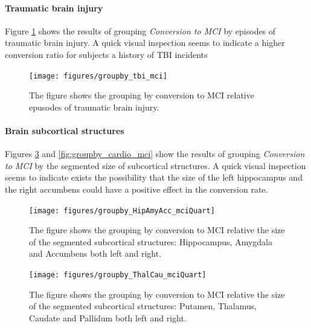 \documentclass[11pt]{article}
\theoremstyle{definition}
\theoremstyle{remark}
\begin{document}
\paragraph*{Traumatic brain injury}
Figure \ref{fig:groupby_tbi_mci} shows the results of grouping \emph{Conversion to MCI} by episodes of traumatic brain injury. A quick visual inspection seems to indicate a higher conversion ratio for subjects a history of TBI incidents

\begin{figure}[H]
        \centering
        \texttt{[image: figures/groupby\_tbi\_mci]}
        \caption{The figure shows the grouping by conversion to MCI relative epusodes of traumatic brain injury.}
        \label{fig:groupby_tbi_mci}
\end{figure}

\paragraph{Brain subcortical structures}

Figures \ref{fig:groupby_HipAmyAcc_mciQuart} and \ref{fig:groupby_cardio_mci} show the results of grouping \emph{Conversion to MCI} by the segmented size of subcortical structures. 
A quick visual inspection seems to indicate exists the possibility that the size of the left hippocampus and the right accumbens could have a positive effect in the conversion rate.

\begin{figure}[H]
        \centering
        \texttt{[image: figures/groupby\_HipAmyAcc\_mciQuart]}
        \caption{The figure shows the grouping by conversion to MCI relative the size of the segmented subcortical structures: Hippocampus, Amygdala and Accumbens both left and right.}
        \label{fig:groupby_HipAmyAcc_mciQuart}
\end{figure}

\begin{figure}[H]
        \centering
        \texttt{[image: figures/groupby\_ThalCau\_mciQuart]}
        \caption{The figure shows the grouping by conversion to MCI relative the size of the segmented subcortical structures: Putamen, Thalamus, Caudate and Pallidum both left and right.}
        \label{fig:groupby_HipAmyAcc_mciQuart}
\end{figure}
\end{document}
